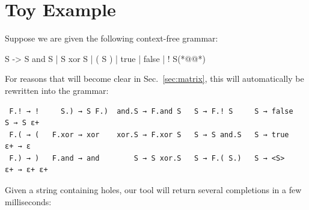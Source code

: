 \documentclass[sigplan,review,anonymous,acmsmall]{acmart}\settopmatter{printfolios=false,printccs=false,printacmref=false}
\begin{document}

\section{Toy Example}

Suppose we are given the following context-free grammar:

\begin{wholetidyinput}
S -> S and S | S xor S | ( S ) | true | false | ! S(*@\caret{ }@*)
\end{wholetidyinput}

\noindent For reasons that will become clear in Sec.~\ref{sec:matrix}, this will automatically be rewritten into the grammar:

\begin{verbatim}
 F.! → !     S.) → S F.)  and.S → F.and S   S → F.! S     S → false    S → S ε+
 F.( → (   F.xor → xor    xor.S → F.xor S   S → S and.S   S → true    ε+ → ε
 F.) → )   F.and → and        S → S xor.S   S → F.( S.)   S → <S>     ε+ → ε+ ε+
\end{verbatim}

%

\noindent Given a string containing holes, our tool will return several completions in a few milliseconds:
\end{document}
